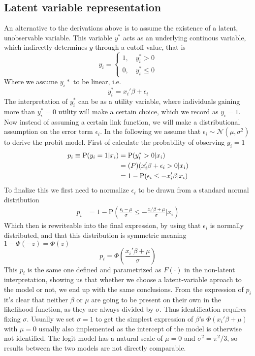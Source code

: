 \subsection{Latent variable representation}
An alternative to the derivations above is to assume the existence of a latent, unobservable variable. This variable $y^*$ acts as an underlying continous variable, which indirectly determines $y$ through a cutoff value, that is
\begin{equation}
y_i = \begin{cases}
1, \quad y_i^* > 0 \\
0, \quad y_i^* \leq 0
\end{cases}
\end{equation}
Where we assume $y_i*$ to be linear, i.e.
\begin{equation}
y_i^* = x_i' \beta + \epsilon_i
\end{equation}
The interpretation of $y_i^*$ can be as a utility variable, where individuals gaining more than $y_i^* = 0$ utility will make a certain choice, which we record as $y_i = 1$. Now instead of assuming a certain link function, we will make a distributional assumption on the error term $\epsilon_i$. In the following we assume that $\epsilon_i \sim \mathcal{N}(\mu, \sigma^2)$ to derive the probit model. First of calculate the probability of observing $y_i = 1$
\begin{align*}
p_i \equiv \textrm{P}(y_i = 1| x_i) &= \textrm{P}(y_i^* > 0 | x_i) \\
& = \textrm(P)(x_i'\beta + \epsilon_i > 0 | x_i)
\\
& = 1-\textrm{P}(\epsilon_i \leq -x_i'\beta | x_i)
\end{align*}
To finalize this we first need to normalize $\epsilon_i$ to be drawn from a standard normal distribution
\begin{align*}
p_i&=1-\textrm{P}\left(\frac{\epsilon_i - \mu}{\sigma} \leq  -\frac{x_i'\beta + \mu}{\sigma} | x_i \right)
\end{align*}
Which then is rewriteable into the final expression, by using that $\epsilon_i$ is normally distributed, and that this distribution is symmetric meaning $1-\Phi(-z)=\Phi(z)$
\begin{equation}
p_i = \Phi\left(\frac{x_i'\beta + \mu}{\sigma} \right)
\end{equation}
This $p_i$ is the same one defined and parametrized as $F(\cdot)$ in the non-latent interpretation, showing us that whether we choose a latent-variable aproach to the model or not, we end up with the same conclusions. From the expression of $p_i$ it's clear that neither $\beta$ or $\mu$ are going to be present on their own in the likelihood function, as they are always divided by $\sigma$. Thus identification requires fixing $\sigma$. Usually we set $\sigma = 1$ to get the simplest expression of $\beta$'s $\Phi(x_i'\beta + \mu)$ with $\mu=0$ usually also implemented as the intercept of the model is otherwise not identified. The logit model has a natural scale of $\mu=0$ and $\sigma^2 = \pi^2/3$, so results between the two models are not directly comparable.

